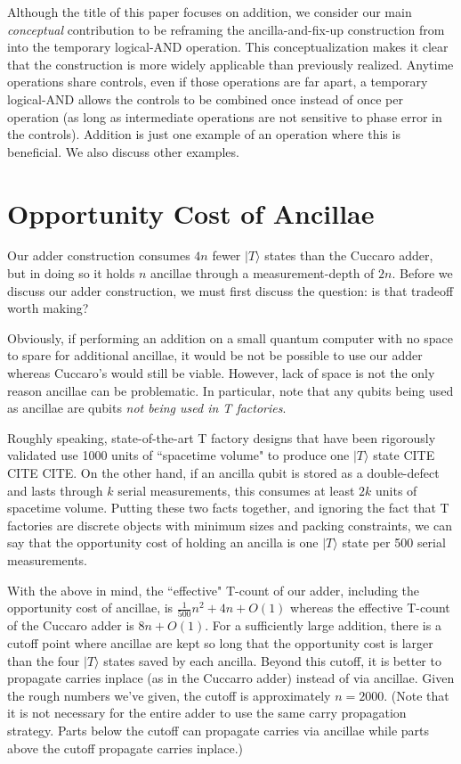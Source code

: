 \documentclass[twocolumn]{quantumarticle-customized}
\begin{document}
Although the title of this paper focuses on addition, we consider our main {\em conceptual} contribution to be reframing the ancilla-and-fix-up construction from \cite{Jones2013} into the temporary logical-AND operation.
This conceptualization makes it clear that the construction is more widely applicable than previously realized.
Anytime operations share controls, even if those operations are far apart, a temporary logical-AND allows the controls to be combined once instead of once per operation (as long as intermediate operations are not sensitive to phase error in the controls).
Addition is just one example of an operation where this is beneficial.
We also discuss other examples.


\section*{Opportunity Cost of Ancillae}

Our adder construction consumes $4n$ fewer $|T\rangle$ states than the Cuccaro adder, but in doing so it holds $n$ ancillae through a measurement-depth of $2n$.
Before we discuss our adder construction, we must first discuss the question: is that tradeoff worth making?

Obviously, if performing an addition on a small quantum computer with no space to spare for additional ancillae, it would be not be possible to use our adder whereas Cuccaro's would still be viable.
However, lack of space is not the only reason ancillae can be problematic.
In particular, note that any qubits being used as ancillae are qubits {\em not being used in T factories}.

Roughly speaking, state-of-the-art T factory designs that have been rigorously validated use 1000 units of ``spacetime volume" to produce one $|T\rangle$ state {\color{red} CITE CITE CITE}.
On the other hand, if an ancilla qubit is stored as a double-defect and lasts through $k$ serial measurements, this consumes at least $2k$ units of spacetime volume.
Putting these two facts together, and ignoring the fact that T factories are discrete objects with minimum sizes and packing constraints, we can say that the opportunity cost of holding an ancilla is one $|T\rangle$ state per 500 serial measurements.

With the above in mind, the ``effective" T-count of our adder, including the opportunity cost of ancillae, is $\frac{1}{500} n^2 + 4n + O(1)$ whereas the effective T-count of the Cuccaro adder is $8n + O(1)$.
For a sufficiently large addition, there is a cutoff point where ancillae are kept so long that the opportunity cost is larger than the four $|T\rangle$ states saved by each ancilla.
Beyond this cutoff, it is better to propagate carries inplace (as in the Cuccarro adder) instead of via ancillae.
Given the rough numbers we've given, the cutoff is approximately $n=2000$.
(Note that it is not necessary for the entire adder to use the same carry propagation strategy.
Parts below the cutoff can propagate carries via ancillae while parts above the cutoff propagate carries inplace.)
\end{document}
